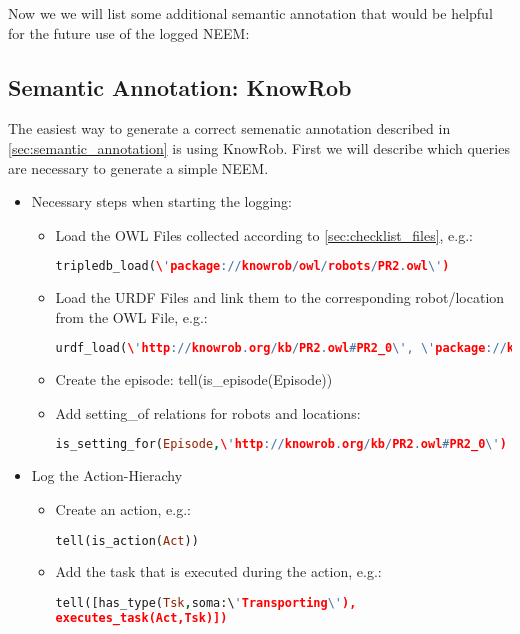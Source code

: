 Now we we will list some additional semantic annotation that would be helpful for the future use of the logged NEEM:


\subsection{Semantic Annotation: KnowRob}

The easiest way to generate a correct semenatic annotation described in \ref{sec:semantic_annotation} is using KnowRob. First we will describe which queries are necessary to generate a simple NEEM.

\begin{itemize}
	\item Necessary steps when starting the logging:
	\begin{itemize}
		\item Load the OWL Files collected according to \ref{sec:checklist_files}, e.g.: 
			\begin{lstlisting}[language=Prolog]
tripledb_load(\'package://knowrob/owl/robots/PR2.owl\')
			\end{lstlisting}
		\item Load the URDF Files and link them to the corresponding robot/location from the OWL File, e.g.:
		\begin{lstlisting}[language=Prolog]
urdf_load(\'http://knowrob.org/kb/PR2.owl#PR2_0\', \'package://knowrob/urdf/pr2.urdf\', [load_rdf])
		\end{lstlisting}
		\item Create the episode: tell(is\_episode(Episode))
		\item Add setting\_of relations for robots and locations: 
		\begin{lstlisting}[language=Prolog]
is_setting_for(Episode,\'http://knowrob.org/kb/PR2.owl#PR2_0\')
		\end{lstlisting}
	\end{itemize}
	\item Log the Action-Hierachy
	\begin{itemize}
		\item Create an action, e.g.:
			\begin{lstlisting}[language=Prolog]
tell(is_action(Act))
			\end{lstlisting}
		\item Add the task that is executed during the action, e.g.: 
			\begin{lstlisting}[language=Prolog]
tell([has_type(Tsk,soma:\'Transporting\'),
executes_task(Act,Tsk)])

\end{lstlisting}
\end{itemize}
\end{itemize}
